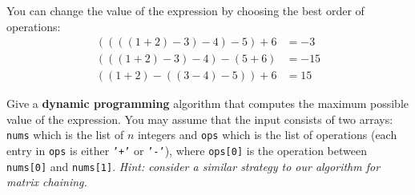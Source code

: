 \documentclass[10pt]{article}
\begin{document}
You can change the value of the expression by choosing the best order of operations:
\begin{align*}
 ((((1 + 2) - 3) - 4) - 5) + 6 &= -3 \\
 (((1 + 2) - 3) - 4) - (5 + 6) &= -15\\
 ((1 + 2) - ((3 - 4) - 5)) + 6 &= 15
\end{align*}

Give a {\bf dynamic programming} algorithm that computes the maximum possible value of the expression. You may assume that
the input consists of two arrays: \texttt{nums} which is the list of $n$ integers and
\texttt{ops} which is the list of operations (each entry in \texttt{ops} is either \texttt{'+'}
or \texttt{'-'}), where \texttt{ops[0]} is the operation between \texttt{nums[0]} and \texttt{nums[1]}. \emph{Hint: consider a similar strategy to our algorithm for matrix chaining.}
\end{document}
